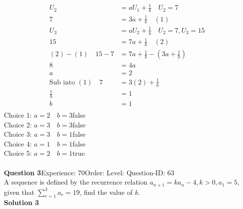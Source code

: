 \documentclass{article}
\begin{document}
\\[-35pt]\begin{align*}
U_2&=aU_1+\displaystyle\frac{1}{b} \quad U_2=7\\[2pt]
7&=3a+\displaystyle\frac{1}{b}\quad (1)\\[12pt]
U_3&=aU_2+\displaystyle\frac{1}{b} \quad U_2=7,U_3=15\\[2pt]
15&=7a+\displaystyle\frac{1}{b}\quad (2)\\[12pt]
(2)-(1)\quad 15-7&=7a+\displaystyle\frac{1}{b}-\left(3a+\displaystyle\frac{1}{b}\right)\\[2pt]
8&=4a\\[2pt]
a&=2\\[2pt]
\text{Sub into}\,\, (1)\quad 7&=3(2)+\displaystyle\frac{1}{b}\\[2pt]
\displaystyle\frac{1}{b}&=1\\[2pt]
b&=1\\[2pt]
\end{align*}
Choice 1: \hspace{20pt}$a=2\quad b=3$\hspace{20pt}false\\
Choice 2: \hspace{20pt}$a=3\quad b=3$\hspace{20pt}false\\
Choice 3: \hspace{20pt}$a=3\quad b=1$\hspace{20pt}false\\
Choice 4: \hspace{20pt}$a=1\quad b=1$\hspace{20pt}false\\
Choice 5: \hspace{20pt}$a=2\quad b=1$\hspace{20pt}true\\
\\[4pt]
\noindent\textbf{Question 3}\hspace{20pt}Experience: 70\hspace{20pt}Order: \hspace{20pt}Level: \hspace{20pt}Question-ID: 63\\[2pt]
A sequence is defined by the recurrence relation $a_{n+1}=ka_n-4,k>0, a_1=5$, given that $\displaystyle\sum_{r=1}^{3} a_r=19$, find the value of $k$.\\[4pt]
\noindent\textbf{Solution 3}\\[2pt]
\end{document}
